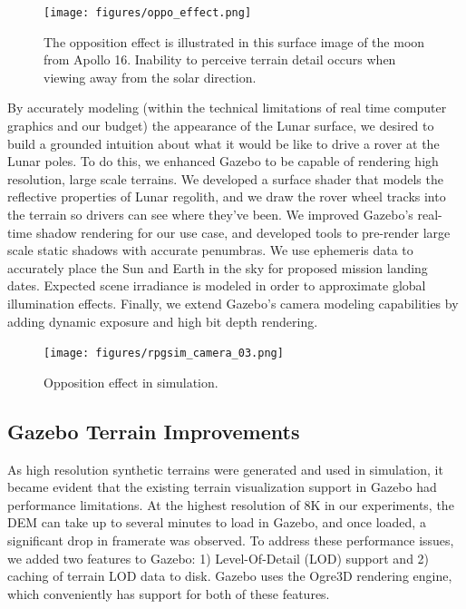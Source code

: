 \documentclass[twocolumn,letterpaper]{IEEEAerospaceCLS}  %
\begin{document}
\begin{figure}[h!]
  \texttt{[image: figures/oppo\_effect.png]}
    \caption{The opposition effect is illustrated in this surface image of the moon from Apollo 16.  Inability to perceive terrain detail occurs when viewing away from the solar direction.}
    \label{fig:oppo_effect}
\end{figure}

By accurately modeling (within the technical limitations of real time computer graphics and our budget) the appearance of the Lunar surface, we desired to build a grounded intuition about what it would be like to drive a rover at the Lunar poles.  
To do this, we enhanced Gazebo to be capable of rendering high resolution, large scale terrains.  
We developed a surface shader that models the reflective properties of Lunar regolith, and we draw the rover wheel tracks into the terrain so drivers can see where they've been.  
We improved Gazebo's real-time shadow rendering for our use case, and developed tools to pre-render large scale static shadows with accurate penumbras.  
We use ephemeris data to accurately place the Sun and Earth in the sky for proposed mission landing dates.  
Expected scene irradiance is modeled in order to approximate global illumination effects.  
Finally, we extend Gazebo's camera modeling capabilities by adding dynamic exposure and high bit depth rendering.  

\begin{figure}[h!]
  \texttt{[image: figures/rpgsim\_camera\_03.png]}
  \caption{Opposition effect in simulation.}
  \label{fig:opposition_in_sim}
\end{figure}

\subsection{Gazebo Terrain Improvements}

As high resolution synthetic terrains were generated and used in simulation, it became evident that the existing terrain visualization support in Gazebo had performance limitations.  
At the highest resolution of 8K in our experiments, the DEM can take up to several minutes to load in Gazebo, and once loaded, a significant drop in framerate was observed.  
To address these performance issues, we added two features to Gazebo: 1) Level-Of-Detail (LOD) support and 2) caching of terrain LOD data to disk.
Gazebo uses the Ogre3D rendering engine, which conveniently has support for both of these features.  
\end{document}
